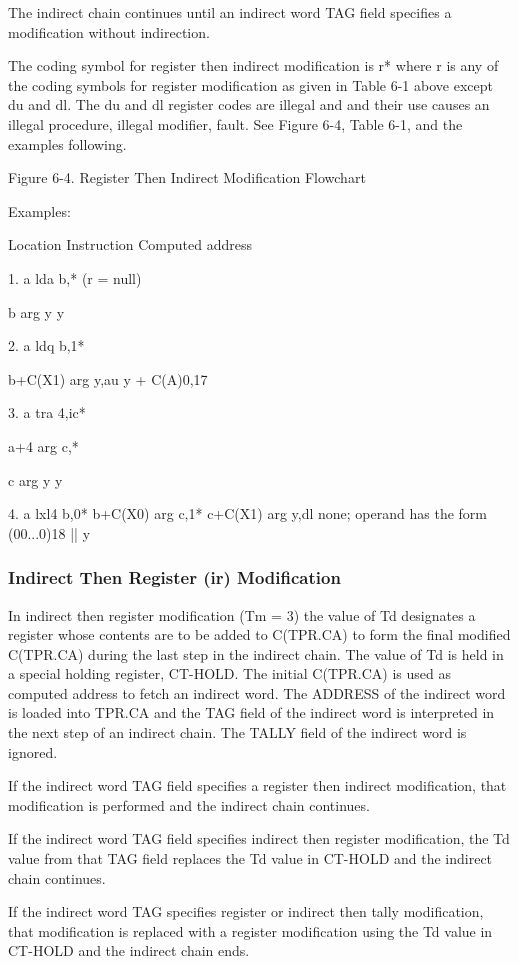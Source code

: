 The indirect chain continues until an indirect word TAG field specifies a
modification without indirection.

The coding symbol for register then indirect modification is r* where r is any
of the coding symbols for register modification as given in Table 6-1 above
except du and dl. The du and dl register codes are illegal and and their use
causes an illegal procedure, illegal modifier, fault. See Figure 6-4, Table
6-1, and the examples following.

Figure 6-4. Register Then Indirect Modification Flowchart

Examples:

Location Instruction Computed address 

1. a lda b,* (r = null)

b arg y y

2. a ldq b,1*

b+C(X1) arg y,au y + C(A)0,17

3. a tra 4,ic*

a+4 arg c,*

c arg y y

4. a lxl4 b,0*
b+C(X0) arg c,1*
c+C(X1) arg y,dl none; operand has the form (00...0)18 || y

\subsubsection{Indirect Then Register (ir) Modification}

In indirect then register modification (Tm = 3) the value of Td designates a
register whose contents are to be added to C(TPR.CA) to form the final modified
C(TPR.CA) during the last step in the indirect chain. The value of Td is held
in a special holding register, CT-HOLD. The initial C(TPR.CA) is used as
computed address to fetch an indirect word. The ADDRESS of the indirect word is
loaded into TPR.CA and the TAG field of the indirect word is interpreted in the
next step of an indirect chain. The TALLY field of the indirect word is
ignored.


If the indirect word TAG field specifies a register then indirect modification,
that modification is performed and the indirect chain continues.  

If the indirect word TAG field specifies indirect then register modification,
the Td value from that TAG field replaces the Td value in CT-HOLD and the
indirect chain continues.  

If the indirect word TAG specifies register or indirect then tally
modification, that modification is replaced with a register modification using
the Td value in CT-HOLD and the indirect chain ends.

